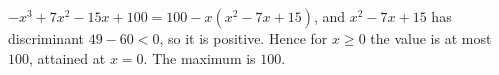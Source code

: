 $-x^3+7x^2-15x+100=100-x\left(x^2-7x+15\right)$, and $x^2-7x+15$ has discriminant $49-60<0$, so it is positive. Hence for $x\ge0$ the value is at most $100$, attained at $x=0$. The maximum is $\boxed{100}$.

